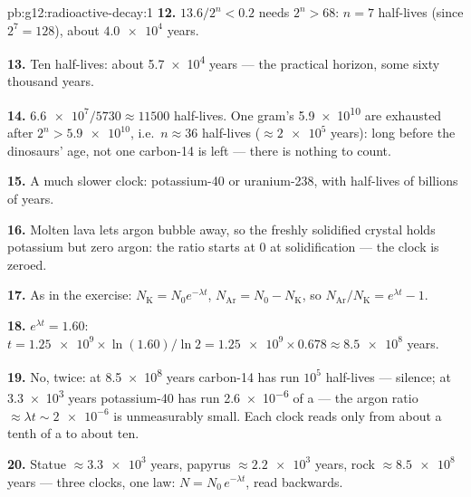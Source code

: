 \begin{solution}{pb:g12:radioactive-decay:1}
\textbf{12.} $13.6/2^n < 0.2$ needs $2^n > 68$: $n = 7$ half-lives
(since $2^7 = 128$), about $\num{4.0e4}$ years.

\textbf{13.} Ten half-lives: about \num{5.7e4} years --- the
practical horizon, some sixty thousand years.

\textbf{14.} $\num{6.6e7}/\num{5730} \approx \num{11500}$ half-lives.
One gram's \num{5.9e10}  are exhausted after
$2^n > \num{5.9e10}$, i.e.\ $n \approx 36$ half-lives
($\approx \num{2e5}$ years): long before the dinosaurs' age, not one
carbon-14  is left --- there is nothing to count.

\textbf{15.} A much slower clock: potassium-40 or uranium-238, with
half-lives of billions of years.

\textbf{16.} Molten lava lets argon bubble away, so the freshly
solidified crystal holds potassium but zero argon: the ratio starts
at $0$ at solidification --- the clock is zeroed.

\textbf{17.} As in the exercise: $N_{\mathrm K} = N_0 e^{-\lambda t}$,
$N_{\mathrm{Ar}} = N_0 - N_{\mathrm K}$, so
$N_{\mathrm{Ar}}/N_{\mathrm K} = e^{\lambda t} - 1$.

\textbf{18.} $e^{\lambda t} = 1.60$:
$t = \num{1.25e9} \times \ln(1.60)/\ln 2 = \num{1.25e9} \times 0.678
\approx \num{8.5e8}$ years.

\textbf{19.} No, twice: at \num{8.5e8} years carbon-14 has run
$10^5$ half-lives --- silence; at \num{3.3e3} years potassium-40 has
run \num{2.6e-6} of a  --- the argon ratio
$\approx \lambda t \sim \num{2e-6}$ is unmeasurably small. Each
clock reads only from about a tenth of a  to about ten.

\textbf{20.} Statue $\approx \num{3.3e3}$ years, papyrus
$\approx \num{2.2e3}$ years, rock $\approx \num{8.5e8}$ years ---
three clocks, one law: $N = N_0\,e^{-\lambda t}$, read backwards.
\end{solution}
